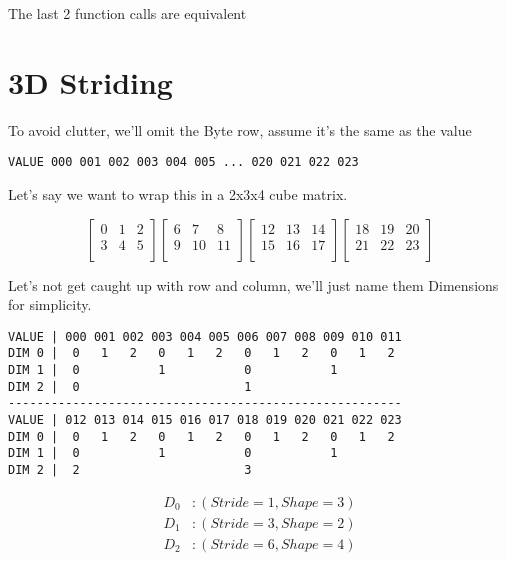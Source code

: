\documentclass[oneside, 12pt]{report}
\begin{document}
The last 2 function calls are equivalent

\section{3D Striding}

To avoid clutter, we'll omit the Byte row, assume it's the same as the value

\begin{verbatim}
VALUE 000 001 002 003 004 005 ... 020 021 022 023
\end{verbatim}

Let's say we want to wrap this in a 2x3x4 cube matrix.

\begin{equation*}
\begin{bmatrix}
0 & 1 & 2 \\
3 & 4 & 5 \\
\end{bmatrix}
\begin{bmatrix}
6 & 7 & 8 \\
9 & 10 & 11 \\
\end{bmatrix}
\begin{bmatrix}
12 & 13 & 14 \\
15 & 16 & 17 \\
\end{bmatrix}
\begin{bmatrix}
18 & 19 & 20 \\
21 & 22 & 23 \\
\end{bmatrix}
\end{equation*}

Let's not get caught up with row and column, we'll just name them Dimensions for simplicity.

\begin{verbatim}
VALUE | 000 001 002 003 004 005 006 007 008 009 010 011 
DIM 0 |  0   1   2   0   1   2   0   1   2   0   1   2
DIM 1 |  0           1           0           1        
DIM 2 |  0                       1                    
-------------------------------------------------------
VALUE | 012 013 014 015 016 017 018 019 020 021 022 023 
DIM 0 |  0   1   2   0   1   2   0   1   2   0   1   2
DIM 1 |  0           1           0           1           
DIM 2 |  2                       3                     
\end{verbatim}

\begin{align*}
D_0&:(Stride=1, Shape=3)\\
D_1&:(Stride=3, Shape=2)\\
D_2&:(Stride=6, Shape=4)\\
\end{align*}
\end{document}
